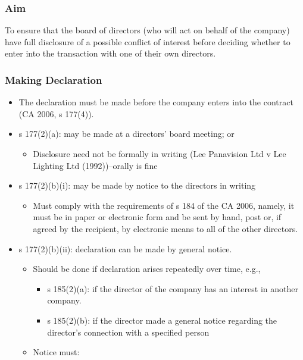 \documentclass[
]{article}
\providecommand{\tightlist}{%
  \setlength{\itemsep}{0pt}\setlength{\parskip}{0pt}}
\begin{document}
\hypertarget{aim}{%
\subsubsection{Aim}\label{aim}}

To ensure that the board of directors (who will act on behalf of the
company) have full disclosure of a possible conflict of interest before
deciding whether to enter into the transaction with one of their own
directors.

\hypertarget{making-declaration}{%
\subsubsection{Making Declaration}\label{making-declaration}}

\begin{itemize}
\tightlist
\item
  The declaration must be made before the company enters into the
  contract (CA 2006, s 177(4)).
\item
  s 177(2)(a): may be made at a directors' board meeting; or

  \begin{itemize}
  \tightlist
  \item
    Disclosure need not be formally in writing (Lee Panavision Ltd v Lee
    Lighting Ltd (1992))--orally is fine
  \end{itemize}
\item
  s 177(2)(b)(i): may be made by notice to the directors in writing

  \begin{itemize}
  \tightlist
  \item
    Must comply with the requirements of s 184 of the CA 2006, namely,
    it must be in paper or electronic form and be sent by hand, post or,
    if agreed by the recipient, by electronic means to all of the other
    directors.
  \end{itemize}
\item
  s 177(2)(b)(ii): declaration can be made by general notice.

  \begin{itemize}
  \tightlist
  \item
    Should be done if declaration arises repeatedly over time, e.g.,

    \begin{itemize}
    \tightlist
    \item
      s 185(2)(a): if the director of the company has an interest in
      another company.
    \item
      s 185(2)(b): if the director made a general notice regarding the
      director's connection with a specified person
    \end{itemize}
  \item
    Notice must:


\end{itemize}
\end{itemize}
\end{document}
